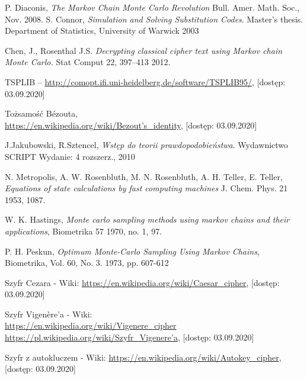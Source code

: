 \documentclass[a4paper]{article}
\theoremstyle{defn}
\theoremstyle{theorem}
\theoremstyle{lemma}
\theoremstyle{cor}
\theoremstyle{fact}
\begin{document}
\newpage
\begin{thebibliography}{9}
P. Diaconis, \emph{The Markov Chain Monte Carlo Revolution}
 Bull. Amer. Math. Soc., Nov.
2008.
S. Connor,
\emph{Simulation and Solving Substitution Codes}. Master's thesis.  Department of Statistics, University of Warwick 2003

Chen, J., Rosenthal J.S. \emph{Decrypting classical cipher text using Markov chain Monte Carlo.} Stat Comput 22, 397–413 2012.

TSPLIB –
\href{http://comopt.ifi.uni-heidelberg.de/software/TSPLIB95/}{http://comopt.ifi.uni-heidelberg.de/software/TSPLIB95/}, [dostęp: 03.09.2020]

Tożsamość Bézouta,\\
\href{https://en.wikipedia.org/wiki/B\%C3\%A9zout\%27s\_identity}{https://en.wikipedia.org/wiki/Bezout's\_identity}, [dostęp: 03.09.2020]

J.Jakubowski, R.Sztencel, \emph{Wstęp do teorii prawdopodobieństwa}. Wydawnictwo SCRIPT Wydanie: 4 rozszerz., 2010

N. Metropolis, A. W. Rosenbluth, M. N. Rosenbluth, A. H. Teller, E. Teller, \emph{Equations of state calculations by fast computing machines}  J. Chem. Phys. 21 1953, 1087.

W. K. Hastings, \emph{Monte carlo sampling methods using markov chains and
their applications}, Biometrika 57 1970, no. 1, 97.

P. H. Peskun, \emph{Optimum Monte-Carlo Sampling Using Markov Chains},  Biometrika, Vol. 60, No. 3. 1973, pp. 607-612

Szyfr Cezara - Wiki:
\href{https://en.wikipedia.org/wiki/Caesar_cipher}{https://en.wikipedia.org/wiki/Caesar\_cipher}, [dostęp: 03.09.2020]

Szyfr Vigenère'a - Wiki:\\
\href{https://en.wikipedia.org/wiki/Vigen\%C3\%A8re\_cipher}{https://en.wikipedia.org/wiki/Vigenere\_cipher}\\
\href{https://pl.wikipedia.org/wiki/Szyfr_Vigen\%C3\%A8re\%E2\%80\%99a}{https://pl.wikipedia.org/wiki/Szyfr\_Vigenere'a}, [dostęp: 03.09.2020]

Szyfr z autokluczem - Wiki:
\href{https://en.wikipedia.org/wiki/Autokey\_cipher}{https://en.wikipedia.org/wiki/Autokey\_cipher}, [dostęp: 03.09.2020]


\end{thebibliography}
\end{document}

